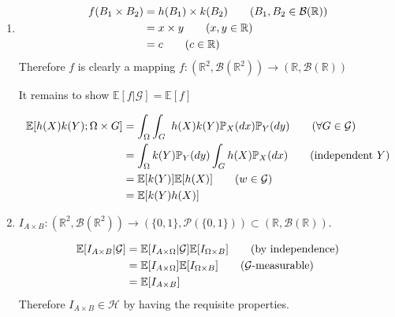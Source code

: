 \documentclass[12pt, letterpaper]{article}
\begin{document}
\begin{enumerate} [label = \textbf{\alph*)}]
\begin{enumerate} [label = \roman*)]
		Therefore $h \in \mathcal{H}$

		\item for $\alpha \in \mathbb{R}$: \newline
		$h = \alpha\cdot f(B_1 \times	B_2) = \alpha \times x \; \; \; $ where $\alpha, x \in \mathbb{R}$.  \newline Which is just a mapping $h :(\mathbb{R}^2, \mathcal{B}(\mathbb{R}^2)) \rightarrow (\mathbb{R}, \mathcal{B}(\mathbb{R}))$. 
		
		$\mathbb{E}[h|\mathcal{G}] = \mathbb{E}[\alpha \cdot f|\mathcal{G}] = \alpha \times \mathbb{E}[f|\mathcal{G}] = \alpha \mathbb{E}[f] = \mathbb{E}[\alpha \cdot f] =\mathbb{E}[h]$
		
		Therefore $h \in \mathcal{H}$
	\end{enumerate}
	
	We have shown $\mathcal{H}$ is a vector space.
	
	\item	 \begin{align*}
			f(B_1 \times B_2) & = h(B_1)\times k(B_2) \tag{$B_1, B_2 \in \mathcal{B}(\mathbb{R})$} \\
			& = x \times y \tag{$x, y \in \mathbb{R}$}\\
			& = c \tag{$c \in \mathbb{R}$}
		\end{align*}
		Therefore $f$ is clearly a mapping $f :(\mathbb{R}^2, \mathcal{B}(\mathbb{R}^2)) \rightarrow (\mathbb{R}, \mathcal{B}(\mathbb{R}))$
		
		It remains to show $\mathbb{E}[f|\mathcal{G}] = \mathbb{E}[f]$
		
		\begin{align*}
			\mathbb{E}[h(X)k(Y); \Omega \times G] & = \int_\Omega\int_G\ h(X) k(Y) \mathbb{P}_X (dx) \mathbb{P}_Y (dy) \tag{$\forall G \in \mathcal{G}$} \\
			& = \int_\Omega k(Y)\mathbb{P}_Y (dy) \int_G h(X) \mathbb{P}_X (dx) \tag{independent $Y$} \\
			& =  \mathbb{E}[k(Y)]\mathbb{E}[h(X)] \tag{$w \in \mathcal{G}$} \\
			& = \mathbb{E}[k(Y)h(X)]
		\end{align*}
	
	\item 
	$I_{A \times B} : (\mathbb{R}^2, \mathcal{B}(\mathbb{R}^2)) \rightarrow (\{0, 1\}, \mathcal{P}(\{0, 1\}))\subset (\mathbb{R}, \mathcal{B}(\mathbb{R}))$.
	
	\begin{align*}
		\mathbb{E}[I_{A\times B}|\mathcal{G}] & = \mathbb{E}[I_{A \times \Omega}|\mathcal{G}]\mathbb{E}[I_{\Omega \times B}] \tag{by independence}\\
		& = \mathbb{E}[I_{A \times \Omega}]\mathbb{E}[I_{\Omega \times B}] \tag{$\mathcal{G}$-measurable}\\
		& = \mathbb{E}[I_{A \times B}]
	\end{align*}
	Therefore $I_{A \times	B} \in \mathcal{H}$ by having the requisite properties. 


\end{enumerate}
\end{document}
